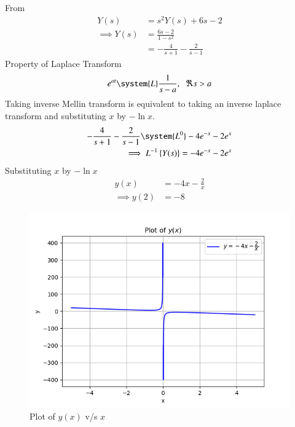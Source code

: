 \documentclass[journal,12pt,twocolumn]{IEEEtran}
\theoremstyle{remark}
\begin{document}
From 
\begin{align}
    Y(s)&=s^2Y(s)+6s-2\\
    \implies Y(s)&= \frac{6s-2}{1-s^2}\\&=-\frac{4}{s+1}-\frac{2}{s-1}
\end{align}
Property of Laplace Transform 
\begin{align}
     e^{at} \system{L} \frac{1}{s-a},\;\; \Re s>a 
\end{align}
Taking inverse Mellin transform is equivalent to taking an inverse laplace transform and substituting $x$ by $-\ln x$.
\begin{align}
    -\frac{4}{s+1}-\frac{2}{s-1}\system{L^{0}} -4e^{-x}-2e^{x}\\
    \implies L^{-1} \cbrak{Y(s)} = -4e^{-x}-2e^{x}
\end{align}
Substituting $x$ by $-\ln x$
\begin{align}
    y(x)&=-4x-\frac{2}{x}\\
    \implies y(2)&=-8
\end{align}
\begin{figure}[h]
    \centering
    \includegraphics[width=\columnwidth]{figs/fig.png}
    \caption{Plot of $y(x)$ v/s $x$}
\end{figure}
\end{document}
